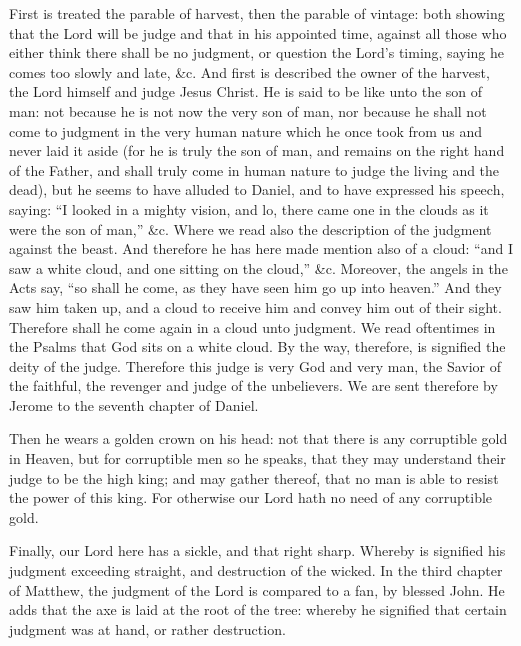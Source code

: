 First is treated the parable of harvest, then the parable of vintage: both showing that the Lord will be judge and that in his appointed time, against all those who either think there shall be no judgment, or question the Lord’s timing, saying he comes too slowly and late, \&c. And first is described the owner of the harvest, the Lord himself and judge Jesus Christ. He is said to be like unto the son of man: not because he is not now the very son of man, nor because he shall not come to judgment in the very human nature which he once took from us and never laid it aside (for he is truly the son of man, and remains on the right hand of the Father, and shall truly come in human nature to judge the living and the dead), but he seems to have alluded to Daniel, and to have expressed his speech, saying: “I looked in a mighty vision, and lo, there came one in the clouds as it were the son of man,” \&c. Where we read also the description of the judgment against the beast. And therefore he has here made mention also of a cloud: “and I saw a white cloud, and one sitting on the cloud,” \&c. Moreover, the angels in the Acts say, “so shall he come, as they have seen him go up into heaven.” And they saw him taken up, and a cloud to receive him and convey him out of their sight. Therefore shall he come again in a cloud unto judgment. We read oftentimes in the Psalms that God sits on a white cloud. By the way, therefore, is signified the deity of the judge. Therefore this judge is very God and very man, the Savior of the faithful, the revenger and judge of the unbelievers. We are sent therefore by Jerome to the seventh chapter of Daniel.

Then he wears a golden crown on his head: not that there is any corruptible gold in Heaven, but for corruptible men so he speaks, that they may understand their judge to be the high king; and may gather thereof, that no man is able to resist the power of this king. For otherwise our Lord hath no need of any corruptible gold.

Finally, our Lord here has a sickle, and that right sharp. Whereby is signified his judgment exceeding straight, and destruction of the wicked. In the third chapter of Matthew, the judgment of the Lord is compared to a fan, by blessed John. He adds that the axe is laid at the root of the tree: whereby he signified that certain judgment was at hand, or rather destruction.


